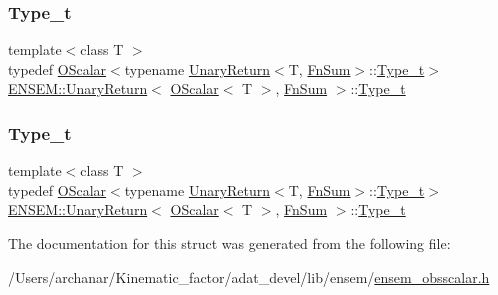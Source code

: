 \subsubsection{\texorpdfstring{Type\_t}{Type\_t}\hspace{0.1cm}{\footnotesize\ttfamily [1/2]}}
{\footnotesize\ttfamily template$<$class T $>$ \\
typedef \mbox{\hyperlink{classENSEM_1_1OScalar}{O\+Scalar}}$<$typename \mbox{\hyperlink{structENSEM_1_1UnaryReturn}{Unary\+Return}}$<$T, \mbox{\hyperlink{structENSEM_1_1FnSum}{Fn\+Sum}}$>$\+::\mbox{\hyperlink{structENSEM_1_1UnaryReturn_3_01OScalar_3_01T_01_4_00_01FnSum_01_4_a02ee406ef93cadbda63ffae33a8ef25a}{Type\+\_\+t}}$>$ \mbox{\hyperlink{structENSEM_1_1UnaryReturn}{E\+N\+S\+E\+M\+::\+Unary\+Return}}$<$ \mbox{\hyperlink{classENSEM_1_1OScalar}{O\+Scalar}}$<$ T $>$, \mbox{\hyperlink{structENSEM_1_1FnSum}{Fn\+Sum}} $>$\+::\mbox{\hyperlink{structENSEM_1_1UnaryReturn_3_01OScalar_3_01T_01_4_00_01FnSum_01_4_a02ee406ef93cadbda63ffae33a8ef25a}{Type\+\_\+t}}}

\mbox{\label{structENSEM_1_1UnaryReturn_3_01OScalar_3_01T_01_4_00_01FnSum_01_4_a02ee406ef93cadbda63ffae33a8ef25a}} 
\subsubsection{\texorpdfstring{Type\_t}{Type\_t}\hspace{0.1cm}{\footnotesize\ttfamily [2/2]}}
{\footnotesize\ttfamily template$<$class T $>$ \\
typedef \mbox{\hyperlink{classENSEM_1_1OScalar}{O\+Scalar}}$<$typename \mbox{\hyperlink{structENSEM_1_1UnaryReturn}{Unary\+Return}}$<$T, \mbox{\hyperlink{structENSEM_1_1FnSum}{Fn\+Sum}}$>$\+::\mbox{\hyperlink{structENSEM_1_1UnaryReturn_3_01OScalar_3_01T_01_4_00_01FnSum_01_4_a02ee406ef93cadbda63ffae33a8ef25a}{Type\+\_\+t}}$>$ \mbox{\hyperlink{structENSEM_1_1UnaryReturn}{E\+N\+S\+E\+M\+::\+Unary\+Return}}$<$ \mbox{\hyperlink{classENSEM_1_1OScalar}{O\+Scalar}}$<$ T $>$, \mbox{\hyperlink{structENSEM_1_1FnSum}{Fn\+Sum}} $>$\+::\mbox{\hyperlink{structENSEM_1_1UnaryReturn_3_01OScalar_3_01T_01_4_00_01FnSum_01_4_a02ee406ef93cadbda63ffae33a8ef25a}{Type\+\_\+t}}}



The documentation for this struct was generated from the following file\+:\begin{DoxyCompactItemize}
\item 
/\+Users/archanar/\+Kinematic\+\_\+factor/adat\+\_\+devel/lib/ensem/\mbox{\hyperlink{lib_2ensem_2ensem__obsscalar_8h}{ensem\+\_\+obsscalar.\+h}}\end{DoxyCompactItemize}
